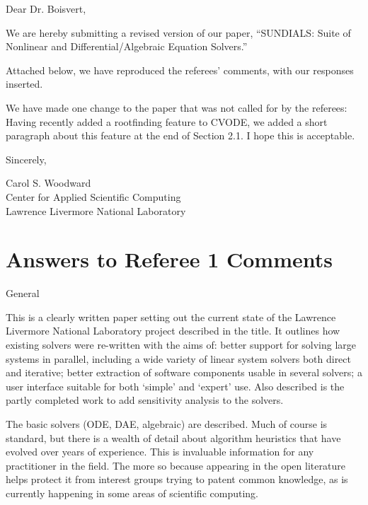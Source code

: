 \batchmode

\setlength{\textheight}{9.0in}
\setlength{\topmargin}{-0.4in}


\begin{letter}



\opening{Dear Dr. Boisvert,}

We are hereby submitting a revised version of our paper, ``SUNDIALS:
Suite of Nonlinear and Differential/Algebraic Equation Solvers.''

Attached below, we have reproduced the referees' comments, with our
responses inserted.

We have made one change to the paper that was not called for by the
referees: Having recently added a rootfinding feature to CVODE, we
added a short paragraph about this feature at the end of Section 2.1.
I hope this is acceptable.


\closing{Sincerely,}

Carol S. Woodward\\
Center for Applied Scientific Computing\\
Lawrence Livermore National Laboratory

\end{letter}


\newpage
\section{Answers to Referee 1 Comments}

General 

This is a clearly written paper setting out the current state of the
Lawrence Livermore National Laboratory project described in the title.
It outlines how existing solvers were re-written with the aims of:
better support for solving large systems in parallel, including a wide
variety of linear system solvers both direct and iterative; better
extraction of software components usable in several solvers; a user
interface suitable for both `simple' and `expert' use. Also described
is the partly completed work to add sensitivity analysis to the
solvers. 

The basic solvers (ODE, DAE, algebraic) are described.  Much of course
is standard, but there is a wealth of detail about algorithm
heuristics that have evolved over years of experience. This is
invaluable information for any practitioner in the field. The more so
because appearing in the open literature helps protect it from
interest groups trying to patent common knowledge, as is currently
happening in some areas of scientific computing.

